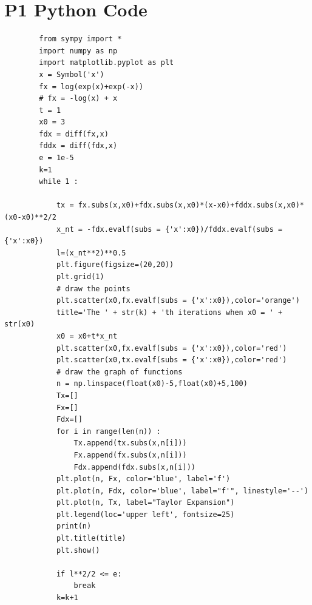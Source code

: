 \documentclass{article}
\theoremstyle{definition}
\theoremstyle{definition}
\theoremstyle{remark}
\begin{document}
\section*{P1 Python Code}
    \begin{verbatim}
        from sympy import *
        import numpy as np
        import matplotlib.pyplot as plt
        x = Symbol('x')
        fx = log(exp(x)+exp(-x))
        # fx = -log(x) + x
        t = 1
        x0 = 3
        fdx = diff(fx,x)
        fddx = diff(fdx,x)
        e = 1e-5
        k=1
        while 1 :
        
            tx = fx.subs(x,x0)+fdx.subs(x,x0)*(x-x0)+fddx.subs(x,x0)*(x0-x0)**2/2
            x_nt = -fdx.evalf(subs = {'x':x0})/fddx.evalf(subs = {'x':x0})
            l=(x_nt**2)**0.5
            plt.figure(figsize=(20,20))
            plt.grid(1)
            # draw the points
            plt.scatter(x0,fx.evalf(subs = {'x':x0}),color='orange')
            title='The ' + str(k) + 'th iterations when x0 = ' + str(x0)
            x0 = x0+t*x_nt
            plt.scatter(x0,fx.evalf(subs = {'x':x0}),color='red')
            plt.scatter(x0,tx.evalf(subs = {'x':x0}),color='red')
            # draw the graph of functions
            n = np.linspace(float(x0)-5,float(x0)+5,100)
            Tx=[]
            Fx=[]
            Fdx=[]
            for i in range(len(n)) :
                Tx.append(tx.subs(x,n[i]))
                Fx.append(fx.subs(x,n[i]))
                Fdx.append(fdx.subs(x,n[i]))
            plt.plot(n, Fx, color='blue', label='f')
            plt.plot(n, Fdx, color='blue', label="f'", linestyle='--')
            plt.plot(n, Tx, label="Taylor Expansion")
            plt.legend(loc='upper left', fontsize=25) 
            print(n)
            plt.title(title)
            plt.show()

            if l**2/2 <= e:
                break
            k=k+1
    \end{verbatim}
\end{document}
